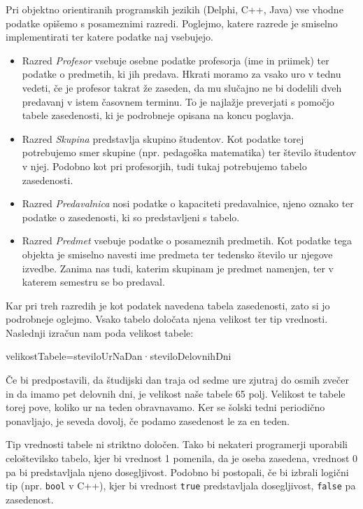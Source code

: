 \documentclass[a4paper,10pt]{article}
\begin{document}
Pri objektno orientiranih programskih jezikih (Delphi, C++, Java) vse vhodne podatke
opišemo s posameznimi razredi. Poglejmo, katere razrede je smiselno implementirati ter
katere podatke naj vsebujejo.
\begin{itemize}
  \item  Razred \emph{Profesor} vsebuje osebne podatke profesorja (ime in priimek) ter
   podatke o predmetih, ki jih predava. Hkrati moramo za vsako uro v tednu vedeti, če
   je profesor takrat že zaseden, da mu slučajno ne bi dodelili dveh predavanj v istem
   časovnem terminu. To je najlažje preverjati s pomočjo tabele zasedenosti, ki je
   podrobneje opisana na koncu poglavja.

  \item Razred \emph{Skupina} predstavlja skupino študentov. Kot podatke torej potrebujemo
   smer skupine (npr. pedagoška matematika) ter število študentov v njej. Podobno kot pri
   profesorjih, tudi tukaj potrebujemo tabelo zasedenosti.

   \item Razred \emph{Predavalnica} nosi podatke o kapaciteti predavalnice, njeno oznako
   ter podatke o zasedenosti, ki so predstavljeni s tabelo.

   \item Razred \emph{Predmet} vsebuje podatke o posameznih predmetih. Kot podatke tega
   objekta je smiselno navesti ime predmeta ter tedensko število ur njegove izvedbe.
   Zanima nas tudi, katerim skupinam je predmet namenjen, ter v katerem semestru se bo
   predaval.
\end{itemize}
Kar pri treh razredih je kot podatek navedena tabela zasedenosti, zato si jo podrobneje
oglejmo. Vsako tabelo določata njena velikost ter tip vrednosti. Naslednji izračun nam
poda velikost tabele:
\begin{center}
velikostTabele=steviloUrNaDan·steviloDelovnihDni
\end{center}
Če bi predpostavili, da študijski dan traja od sedme ure zjutraj do osmih zvečer in da
imamo pet delovnih dni, je velikost naše tabele 65 polj. Velikost te tabele torej pove,
koliko ur na teden obravnavamo. Ker se šolski tedni periodično ponavljajo, je seveda
dovolj, če podamo zasedenost le za en teden.

Tip vrednosti tabele ni striktno določen. Tako bi nekateri programerji uporabili
celoštevilsko tabelo, kjer bi vrednost 1 pomenila, da je oseba zasedena, vrednost 0
pa bi predstavljala njeno dosegljivost. Podobno bi postopali, če bi izbrali logični
tip (npr. \texttt{bool} v C++), kjer bi vrednost \texttt{true} predstavljala
dosegljivost, \texttt{false} pa zasedenost.
\end{document}
